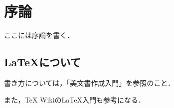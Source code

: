\section{序論}
\label{sec:intro}

ここには序論を書く．

\subsection{\LaTeX について}
書き方については，「美文書作成入門」\cite{奥村本}を参照のこと．

また，TeX Wikiの\LaTeX 入門\cite{LaTeX入門}も参考になる．
